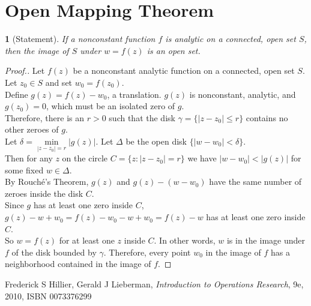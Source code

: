 \documentclass[12pt,letterpaper]{article}
\theoremstyle{named}
\newtheorem*{theorem}{}
\begin{document}
\section{Open Mapping Theorem}
\begin{theorem}[Statement]
	If a nonconstant function $f$ is analytic on a connected, open set $S$, then the image of
	$S$ under $w = f(z)$ is an open set.
\end{theorem}
\begin{proof}[Proof.]
Let $f(z)$ be a nonconstant analytic function on a connected, open set $S$.
\\ Let $z_{0} \in S$ and set $w_{0} = f(z_{0})$.
\\ Define $g(z) = f(z) - w_{0}$, a translation.  $g(z)$ is nonconstant, analytic, and $g(z_{0}) = 0$, which must
be an isolated zero of $g$.
\\ Therefore, there is an $r > 0$ such that the disk $\gamma = \{ |z - z_{0}| \leq r \}$ contains no other zeroes of $g$.
\\ Let $\delta = \min\limits_{|z - z_{0}| = r} |g(z)|$.
Let $\Delta$ be the open disk  $\{ |w - w_{0}| < \delta \}$.
\\ Then for any $z$ on the circle $C = \{z: |z - z_{0}| = r\}$ we have $|w - w_{0}| < |g(z)|$ for some fixed $w \in \Delta$.
\\ By Rouch\'{e}'s Theorem, $g(z)$ and $g(z) - (w - w_{0})$ have the same number of zeroes inside the disk $C$.
\\ Since $g$ has at least one zero inside $C$, $g(z) - w + w_{0} = f(z) - w_{0} - w + w_{0} = f(z) - w$
has at least one zero inside $C$.
\\ So $w = f(z)$ for at least one $z$ inside $C$.  In other words,
$w$ is in the image under $f$ of the disk bounded by $\gamma$.
Therefore, every point $w_{0}$ in the image of $f$ has a neighborhood contained in the image of $f$.
\end{proof}

%

\begin{thebibliography}{44}
Frederick S Hillier, Gerald J Lieberman, \emph{Introduction to Operations Research}, 9e, 2010, ISBN 0073376299
\end{thebibliography}
\end{document}
